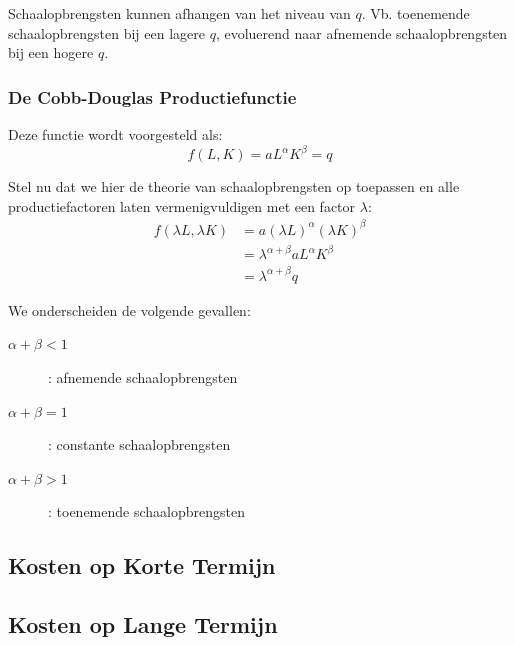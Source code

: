 Schaalopbrengsten kunnen afhangen van het niveau van $q$. Vb. toenemende schaalopbrengsten bij een lagere $q$, evoluerend naar afnemende schaalopbrengsten bij een hogere $q$.

\subsubsection{De Cobb-Douglas Productiefunctie}
Deze functie wordt voorgesteld als:
\begin{equation}
	f(L,K) = a L^\alpha K^\beta = q
\end{equation}

Stel nu dat we hier de theorie van schaalopbrengsten op toepassen en alle productiefactoren laten vermenigvuldigen met een factor $\lambda$:
\begin{align}
	f(\lambda L, \lambda K) &= a (\lambda L)^\alpha (\lambda K)^\beta	\\
	&= \lambda^{\alpha + \beta} a L^\alpha K^\beta	\\
	&= \lambda^{\alpha + \beta} q
\end{align}

We onderscheiden de volgende gevallen:
\begin{description}
	\item[$\alpha + \beta < 1$]: afnemende schaalopbrengsten
	\item[$\alpha + \beta = 1$]: constante schaalopbrengsten
	\item[$\alpha + \beta > 1$]: toenemende schaalopbrengsten
\end{description}



\subsection{Kosten op Korte Termijn}


\subsection{Kosten op Lange Termijn}
